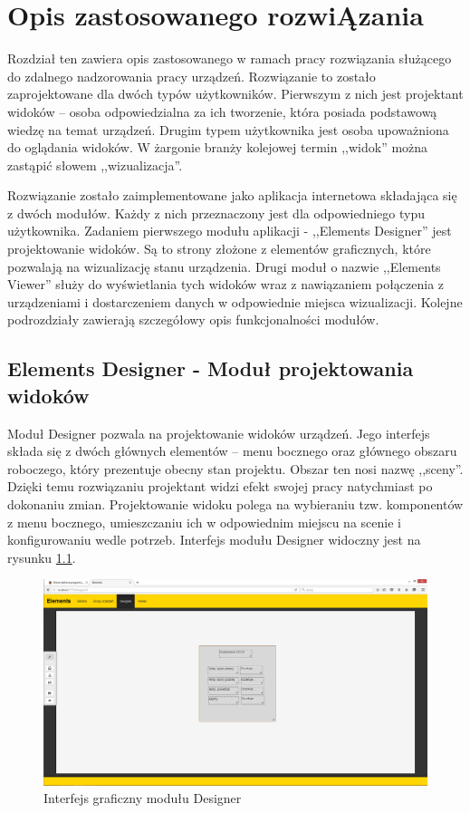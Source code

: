 \chapter{Opis zastosowanego rozwi\k{A}zania}

Rozdział ten zawiera opis zastosowanego w ramach pracy rozwiązania służącego do zdalnego nadzorowania pracy urządzeń. Rozwiązanie to zostało zaprojektowane dla dwóch typów użytkowników. Pierwszym z nich jest projektant widoków – osoba odpowiedzialna za ich tworzenie, która posiada podstawową wiedzę na temat urządzeń. Drugim typem użytkownika jest osoba upoważniona do oglądania widoków. W żargonie branży kolejowej termin ,,widok'' można zastąpić słowem ,,wizualizacja''.

Rozwiązanie zostało zaimplementowane jako aplikacja internetowa składająca się z dwóch modułów. Każdy z nich przeznaczony jest dla odpowiedniego typu użytkownika. Zadaniem pierwszego modułu aplikacji - ,,Elements Designer'' jest projektowanie widoków. Są to strony złożone z elementów graficznych, które pozwalają na wizualizację stanu urządzenia. Drugi moduł o nazwie ,,Elements Viewer'' służy do wyświetlania tych widoków wraz z nawiązaniem połączenia z urządzeniami i dostarczeniem danych w odpowiednie miejsca wizualizacji. Kolejne podrozdziały zawierają szczegółowy opis funkcjonalności modułów.

\section{Elements Designer - Moduł projektowania widoków}

Moduł Designer pozwala na projektowanie widoków urządzeń. Jego interfejs składa się z dwóch głównych elementów – menu bocznego oraz głównego obszaru roboczego, który prezentuje obecny stan projektu. Obszar ten nosi nazwę ,,sceny''. Dzięki temu rozwiązaniu projektant widzi efekt swojej pracy natychmiast po dokonaniu zmian.
Projektowanie widoku polega na wybieraniu tzw. komponentów z menu bocznego, umieszczaniu ich w odpowiednim miejscu na scenie i konfigurowaniu wedle potrzeb. Interfejs modułu Designer widoczny jest na rysunku \ref{fig:designer_complete}.


\begin{figure}[h]
\centerline{
	\includegraphics[width=180mm]{./img/screen/designer_projektgotowy.png}
	}
	\caption{Interfejs graficzny modułu Designer}
	\label{fig:designer_complete}
\end{figure}

